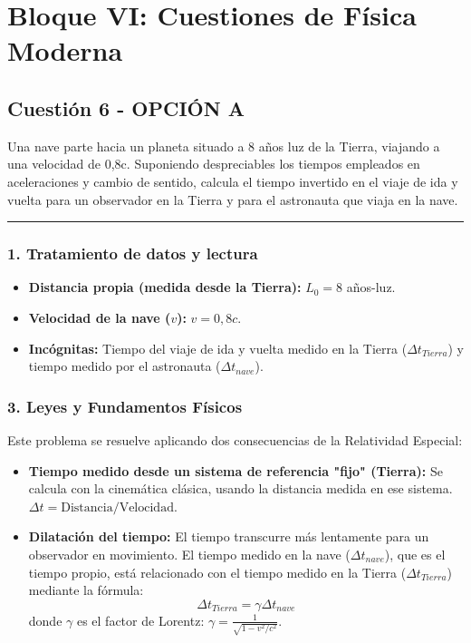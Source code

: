 \newpage

\section{Bloque VI: Cuestiones de Física Moderna}
\label{sec:moderna2_2009_jun_ord}

\subsection{Cuestión 6 - OPCIÓN A}
\label{subsec:6A_2009_jun_ord}

\begin{cajaenunciado}
Una nave parte hacia un planeta situado a 8 años luz de la Tierra, viajando a una velocidad de 0,8c. Suponiendo despreciables los tiempos empleados en aceleraciones y cambio de sentido, calcula el tiempo invertido en el viaje de ida y vuelta para un observador en la Tierra y para el astronauta que viaja en la nave.
\end{cajaenunciado}
\hrule

\subsubsection*{1. Tratamiento de datos y lectura}
\begin{itemize}
    \item \textbf{Distancia propia (medida desde la Tierra):} $L_0 = 8$ años-luz.
    \item \textbf{Velocidad de la nave ($v$):} $v = 0,8c$.
    \item \textbf{Incógnitas:} Tiempo del viaje de ida y vuelta medido en la Tierra ($\Delta t_{Tierra}$) y tiempo medido por el astronauta ($\Delta t_{nave}$).
\end{itemize}

\subsubsection*{3. Leyes y Fundamentos Físicos}
Este problema se resuelve aplicando dos consecuencias de la Relatividad Especial:
\begin{itemize}
    \item \textbf{Tiempo medido desde un sistema de referencia "fijo" (Tierra):} Se calcula con la cinemática clásica, usando la distancia medida en ese sistema. $\Delta t = \text{Distancia}/\text{Velocidad}$.
    \item \textbf{Dilatación del tiempo:} El tiempo transcurre más lentamente para un observador en movimiento. El tiempo medido en la nave ($\Delta t_{nave}$), que es el tiempo propio, está relacionado con el tiempo medido en la Tierra ($\Delta t_{Tierra}$) mediante la fórmula:
    $$ \Delta t_{Tierra} = \gamma \Delta t_{nave} $$
    donde $\gamma$ es el factor de Lorentz: $\gamma = \frac{1}{\sqrt{1-v^2/c^2}}$.
\end{itemize}

